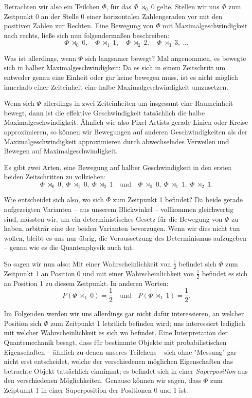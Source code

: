 \documentclass[a4paper,12pt,ngerman]{scrartcl}
\theoremstyle{plain}
\theoremstyle{plain}
\theoremstyle{plain}
\theoremstyle{plain}
\newcommand{\at}[1]{\;\rtimes_{#1}\;}
\begin{document}
Betrachten wir also ein Teilchen $\Phi$, für das $\Phi \at{0} 0$ gelte. Stellen wir uns $\Phi$ zum Zeitpunkt 0 an der Stelle 0 einer horizontalen Zahlengeraden vor mit den positiven Zahlen zur Rechten. Eine Bewegung von $\Phi$ mit Maximalgeschwindigkeit nach rechts, ließe sich nun folgendermaßen beschreiben:
\[\Phi \at{0} 0,\quad \Phi \at{1} 1,\quad \Phi \at{2} 2,\quad\Phi\at{3} 3,\;\dots\]

Was ist allerdings, wenn $\Phi$ sich langsamer bewegt? Mal angenommen, es bewegte sich in halber Maximalgeschwindigkeit: Da es sich in einem Zeitschritt um entweder genau eine Einheit oder gar keine bewegen muss, ist es nicht möglich innerhalb einer Zeiteinheit eine halbe Maximalgeschwindigkeit umzusetzen. 

Wenn sich $\Phi$ allerdings in zwei Zeiteinheiten um insgesamt eine Raumeinheit bewegt, dann ist die effektive Geschwindigkeit tatsächlich die halbe Maximalgeschwindigkeit. Ähnlich wie also Pixel-Artists gerade Linien oder Kreise approximieren, so können wir Bewegungen auf anderen Geschwindigkeiten als der Maximalgeschwindigkeit approximieren durch abwechselndes Verweilen und Bewegen auf Maximalgeschwindigkeit.


Es gibt zwei Arten, eine Bewegung auf halber Geschwindigkeit in den ersten beiden Zeitschritten zu vollziehen:
\[\Phi\at{0}0,\;\Phi\at{1}0,\; \Phi\at{2}1 \quad\text{und}\quad \Phi\at{0}0,\;\Phi\at{1}1,\;\Phi\at{2}1.\]

Wie entscheidet sich also, wo sich $\Phi$ zum Zeitpunkt 1 befindet? Da beide gerade aufgezeigten Varianten -- aus unserem Blickwinkel -- vollkommen gleichwertig sind, müssten wir, um ein deterministisches Gesetz für die Bewegung von $\Phi$ zu haben, arbiträr eine der beiden Varianten bevorzugen. Wenn wir dies nicht tun wollen, bleibt es uns nur übrig, die Voraussetzung des Determinismus aufzugeben -- genau wie es die Quantenphysik auch tat. 

So sagen wir nun also: Mit einer Wahrscheinlichkeit von $\frac{1}{2}$ befindet sich $\Phi$ zum Zeitpunkt 1 an Position 0 und mit einer Wahrscheinlichkeit von $\frac{1}{2}$ befindet es sich an Position 1 zu diesem Zeitpunkt. In anderen Worten: 
\[P(\Phi\at{1}0)=\frac{1}{2} \quad\text{und}\quad P(\Phi\at{1}1)=\frac{1}{2}.\]

Im Folgenden werden wir uns allerdings gar nicht dafür interessieren, an welcher Position sich $\Phi$ zum Zeitpunkt 1 letztlich befinden wird; uns interessiert lediglich mit welcher Wahrscheinlichkeit es sich wo befindet. Eine Interpretation der Quantemechanik besagt, dass für bestimmte Objekte mit probabilistischen Eigenschaften -- ähnlich zu denen unseres Teilchens -- sich ohne "Messung" gar nicht erst entscheidet, welche der verschiedenen möglichen Eigenschaften das betrachte Objekt tatsächlich einnimmt; es befindet sich in einer \textit{Superposition} aus den verschiedenen Möglichkeiten. Genauso können wir sagen, dass $\Phi$ zum Zeiptunkt 1 in einer Superposition der Positionen 0 und 1 ist.
\end{document}
